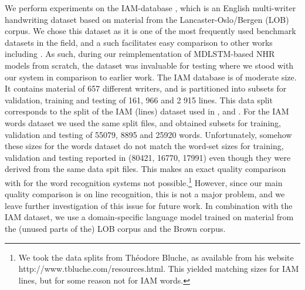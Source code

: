 \documentclass[conference]{IEEEtran}
\renewcommand{\ac}[1]{\gls{#1}}
\begin{document}
We perform experiments on the IAM-database \cite{IAM-Database}, which is an English multi-writer 
handwriting dataset based on material from the Lancaster-Oslo/Bergen (LOB) corpus. We chose this 
dataset as it is one of the most frequently used benchmark datasets in the field, and a such 
facilitates easy comparison to other works including \cite{PhamEtAl2014, Voigtlaender2016, Puigcerver2017}. 
As such, during our reimplementation of \ac{MDLSTM}-based \ac{NHR} models from scratch,
the dataset was invaluable for testing where we stood with our system in comparison to earlier work.
The IAM database is of moderate size. It contains material of 657 different writers, 
and is partitioned into subsets for validation, training and testing of 161, 966 and 2 915 lines.
This data split corresponds to the split of the IAM (lines) dataset used in \cite{PhamEtAl2014}, \cite{Voigtlaender2016} and \cite{Puigcerver2017}. For the IAM words dataset we used the same split files, and obtained subsets for  training, validation and testing of 
55079, 8895 and 25920 words. Unfortunately, somehow these sizes for the words dataset do not match the word-set sizes for 
training, validation and testing  reported in  \cite{PhamEtAl2014} (80421, 16770, 17991)
even though they were derived from the same data spit files. This makes an exact quality comparison with \cite{PhamEtAl2014} for the word recognition systems not possible.\footnote{We took the data splits from Th\'{e}odore Bluche, as available from his website http://www.tbluche.com/resources.html. This yielded matching sizes for IAM lines, but for some reason not for IAM words. }
However, since our main quality comparison is on line recognition, this is not a major problem, 
and we leave further investigation of this issue for future work.
In combination with the IAM dataset, we use a domain-specific language model trained on material from the 
(unused parts of the) LOB corpus and the Brown corpus.
\end{document}
